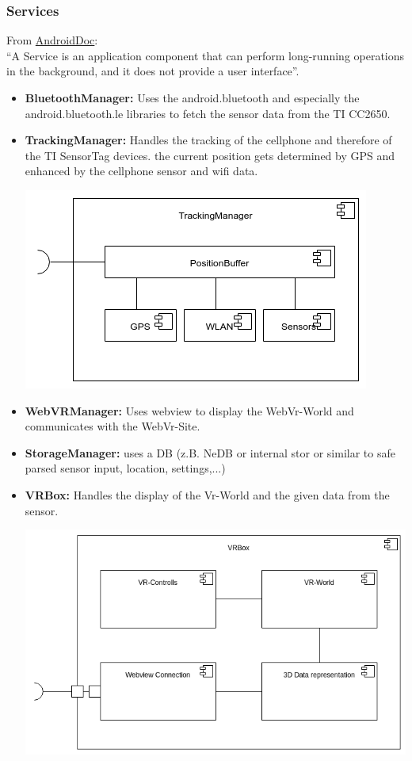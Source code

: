 \subsubsection{Services}
From \href{https://developer.android.com/guide/components/services.html}{AndroidDoc}: \\
``A Service is an application component that can perform long-running operations in the background, and it does not provide a user interface''.
\begin{itemize}
  \item \textbf{BluetoothManager:} Uses the android.bluetooth and especially the android.bluetooth.le libraries to fetch the sensor data from the TI CC2650.
  \item \textbf{TrackingManager:} Handles the tracking of the cellphone and therefore of the TI SensorTag devices. the current position gets determined by GPS and enhanced by the cellphone sensor and wifi data.
  \begin{center}
  \includegraphics[scale=0.4]{pics/TrackingManager_Composition.png}
  \end{center}
  
  \item \textbf{WebVRManager:} Uses webview to display the WebVr-World and communicates with the WebVr-Site.
  \item \textbf{StorageManager:} uses a DB (z.B. NeDB or internal stor or similar to safe parsed sensor input, location, settings,...)
  \item \textbf{VRBox:} Handles the display of the Vr-World and the given data from the sensor.

  \includegraphics[scale=0.35]{pics/VRBox.png}

\end{itemize}


